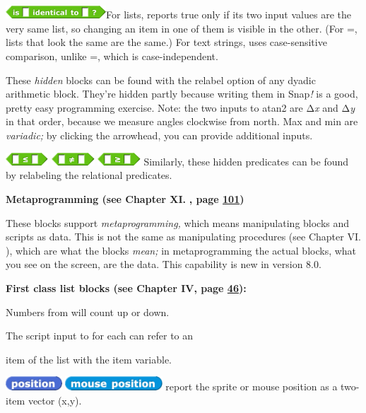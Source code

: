 \includegraphics[width=1.47986in,height=0.18958in]{media/image170.png}For
lists, reports true only if its two input values are the very same list,
so changing an item in one of them is visible in the other. (For =,
lists that look the same are the same.) For text strings, uses
case-sensitive comparison, unlike =, which is case-independent.

These \emph{hidden} blocks can be found with the relabel option of any
dyadic arithmetic block. They're hidden partly because writing them in
Snap\emph{!} is a good, pretty easy programming exercise. Note: the two
inputs to atan2 are Δ\emph{x} and Δ\emph{y} in that order, because we
measure angles clockwise from north. Max and min are \emph{variadic;} by
clicking the arrowhead, you can provide additional inputs.

\includegraphics[width=0.63in,height=0.19in]{media/image177.png}
\includegraphics[width=0.63in,height=0.19in]{media/image178.png}
\includegraphics[width=0.63in,height=0.19in]{media/image179.png}
Similarly, these hidden predicates can be found by relabeling the
relational predicates.

\textbf{Metaprogramming (see Chapter XI.} \textbf{, page
\hyperref[metaprogramming]{101})}

These blocks support \emph{metaprogramming,} which means manipulating
blocks and scripts as data. This is not the same as manipulating
procedures (see Chapter VI. ), which are what the blocks \emph{mean;} in
metaprogramming the actual blocks, what you see on the screen, are the
data. This capability is new in version 8.0.

\textbf{First class list blocks (see Chapter IV, page
\hyperref[first-class-lists]{46}):}

Numbers from will count up or down.

The script input to for each can refer to an

item of the list with the item variable.

\textbf{\hfill\break
}\includegraphics[width=0.83in,height=0.21in]{media/image224.png}
\includegraphics[width=1.43in,height=0.21in]{media/image225.png} report
the sprite or mouse position as a two-item vector (x,y).

